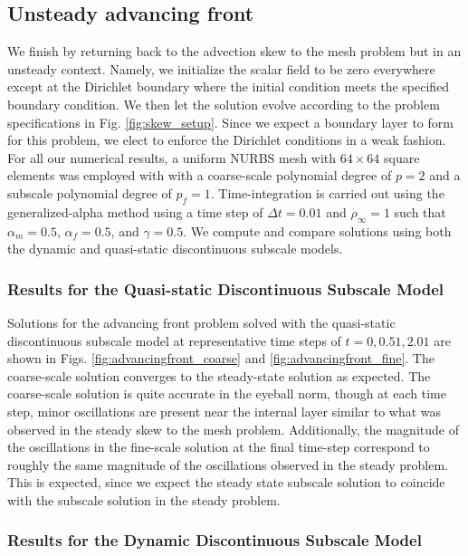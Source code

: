 \documentclass[11pt]{article}
\begin{document}
\subsection{Unsteady advancing front}

We finish by returning back to the advection skew to the mesh problem but in an unsteady context.  Namely, we initialize the scalar field to be zero everywhere except at the Dirichlet boundary where the initial condition meets the specified boundary condition.  We then let the solution evolve according to the problem specifications in Fig. \ref{fig:skew_setup}.  Since we expect a boundary layer to form for this problem, we elect to enforce the Dirichlet conditions in a weak fashion.  For all our numerical results, a uniform NURBS mesh with $64 \times 64$ square elements was employed with 
with a coarse-scale polynomial degree of $p = 2$ and a subscale polynomial degree of $p_f = 1$.  Time-integration is carried out using the generalized-alpha method using a time step of $\Delta t = 0.01$ and $\rho_{\infty} = 1$ such that $\alpha_m = 0.5$, $\alpha_f = 0.5$, and $\gamma = 0.5$.  We compute and compare solutions using both the dynamic and quasi-static discontinuous subscale models.

\subsubsection{Results for the Quasi-static Discontinuous Subscale Model}

Solutions for the advancing front problem solved with the quasi-static discontinuous subscale model at representative time steps of $t = 0, 0.51, 2.01$ are shown in Figs. \ref{fig:advancingfront_coarse} and \ref{fig:advancingfront_fine}.  The coarse-scale solution converges to the steady-state solution as expected.  The coarse-scale solution is quite accurate in the eyeball norm, though at each time step, minor oscillations are present near the internal layer similar to what was observed in the steady skew to the mesh problem.  Additionally, the magnitude of the oscillations in the fine-scale solution at the final time-step correspond to roughly the same magnitude of the oscillations observed in the steady problem.  This is expected, since we expect the steady state subscale solution to coincide with the subscale solution in the steady problem.

\subsubsection{Results for the Dynamic Discontinuous Subscale Model}
\end{document}
